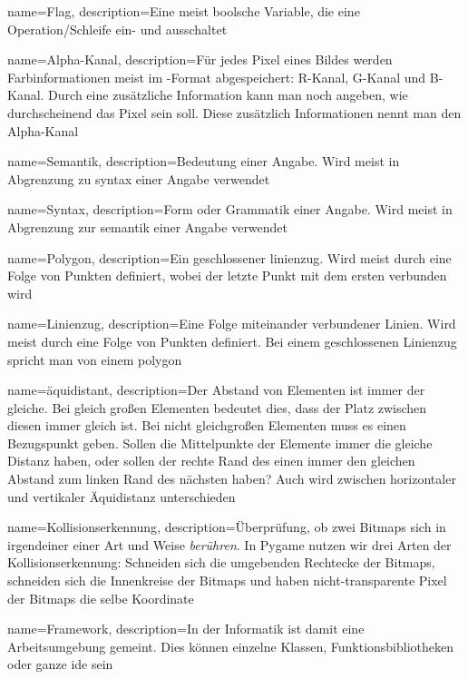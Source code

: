 {
  name={Flag},
  description={Eine meist boolsche Variable, die eine Operation/Schleife ein- und ausschaltet} 
}

{
  name={Alpha-Kanal},
  description={Für jedes Pixel eines Bildes werden Farbinformationen meist im -Format abgespeichert: R-Kanal, G-Kanal und B-Kanal. Durch eine zusätzliche Information kann man noch angeben, wie durchscheinend das Pixel sein soll. Diese zusätzlich Informationen nennt man den Alpha-Kanal} 
}

{
  name={Semantik},
  description={Bedeutung einer Angabe. Wird meist in Abgrenzung zu \Gls{syntax} einer Angabe verwendet} 
}

{
  name={Syntax},
  description={Form oder Grammatik einer Angabe. Wird meist in Abgrenzung zur \Gls{semantik} einer Angabe verwendet} 
}

{
  name={Polygon},
  description={Ein geschlossener \gls{linienzug}. Wird meist durch eine Folge von Punkten definiert, wobei der letzte Punkt mit dem ersten verbunden wird} 
}

{
  name={Linienzug},
  description={Eine Folge miteinander verbundener Linien. Wird meist durch eine Folge von Punkten definiert. Bei einem geschlossenen Linienzug spricht man von einem \gls{polygon}} 
}

{
	name={\"aquidistant},
	description={Der Abstand von Elementen ist immer der gleiche. Bei gleich großen Elementen bedeutet dies, dass der Platz zwischen diesen immer gleich ist. Bei nicht gleichgroßen Elementen muss es einen Bezugspunkt geben. Sollen die Mittelpunkte der Elemente immer die gleiche Distanz haben, oder sollen der rechte Rand des einen immer den gleichen Abstand zum linken Rand des nächsten haben? Auch wird zwischen horizontaler und vertikaler Äquidistanz unterschieden} 
}

 {
 	name={Kollisionserkennung},
 	description={Überprüfung, ob zwei Bitmaps sich in irgendeiner einer Art und Weise \emph{berühren}. In Pygame nutzen wir drei Arten der Kollisionserkennung: Schneiden sich die umgebenden Rechtecke der Bitmaps, schneiden sich die Innenkreise der Bitmaps und haben nicht-transparente Pixel der Bitmaps die selbe Koordinate} 
 }
 
 {
 	name={Framework},
 	description={In der Informatik ist damit eine Arbeitsumgebung gemeint. Dies können einzelne Klassen, Funktionsbibliotheken oder ganze \Gls{ide} sein} 
 }
 
